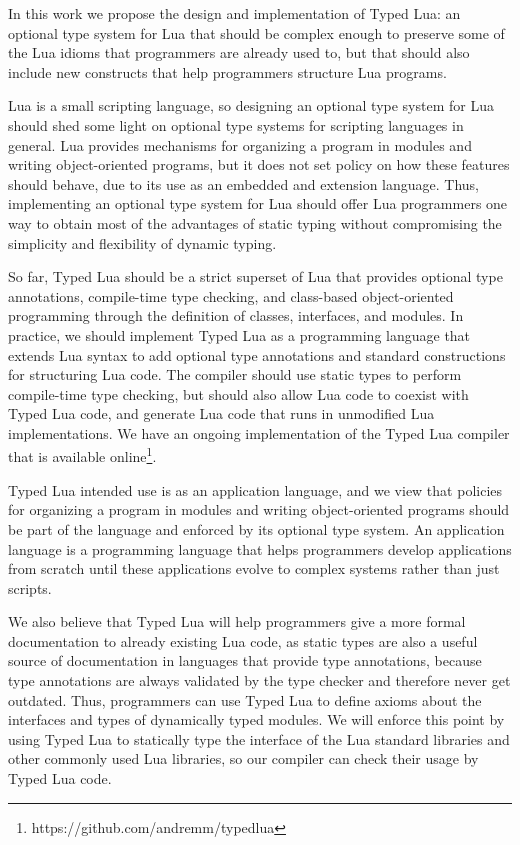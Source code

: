 \documentclass[preprint]{sig-alternate}
\begin{document}
In this work we propose the design and implementation of Typed Lua:
an optional type system for Lua that should be complex enough to
preserve some of the Lua idioms that programmers are already used to,
but that should also include new constructs that help programmers
structure Lua programs.

Lua is a small scripting language, so designing an optional type
system for Lua should shed some light on optional type systems for
scripting languages in general.
Lua provides mechanisms for organizing a program in modules and
writing object-oriented programs, but it does not set policy on how
these features should behave, due to its use as an embedded and
extension language.
Thus, implementing an optional type system for Lua should offer Lua
programmers one way to obtain most of the advantages of static typing
without compromising the simplicity and flexibility of dynamic typing.

So far, Typed Lua should be a strict superset of Lua that
provides optional type annotations, compile-time type checking, and
class-based object-oriented programming through the definition of
classes, interfaces, and modules.
In practice, we should implement Typed Lua as a programming
language that extends Lua syntax to add optional type annotations
and standard constructions for structuring Lua code.
The compiler should use static types to perform compile-time type
checking, but should also allow Lua code to coexist with Typed Lua
code, and generate Lua code that runs in unmodified Lua
implementations.
We have an ongoing implementation of the Typed Lua compiler that is
available online\footnote{https://github.com/andremm/typedlua}.

Typed Lua intended use is as an application language, and we view
that policies for organizing a program in modules and writing
object-oriented programs should be part of the language and
enforced by its optional type system.
An application language is a programming language that helps
programmers develop applications from scratch until these
applications evolve to complex systems rather than just scripts.

We also believe that Typed Lua will help programmers give a more
formal documentation to already existing Lua code, as static types
are also a useful source of documentation in languages that provide
type annotations, because type annotations are always validated by
the type checker and therefore never get outdated.
Thus, programmers can use Typed Lua to define axioms about the
interfaces and types of dynamically typed modules.
We will enforce this point by using Typed Lua to statically type
the interface of the Lua standard libraries and other commonly used
Lua libraries, so our compiler can check their usage by Typed Lua
code.
\end{document}
